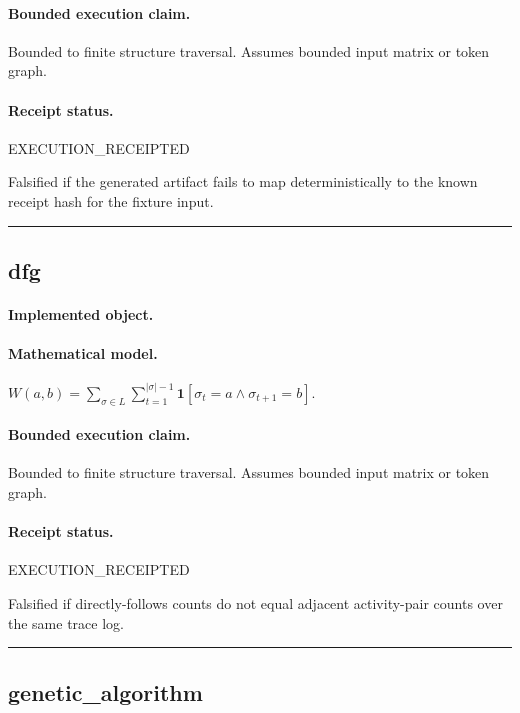 \paragraph{Bounded execution claim.} Bounded to finite structure traversal. Assumes bounded input matrix or token graph.
\paragraph{Receipt status.} EXECUTION\_RECEIPTED
\begin{falsifier}
Falsified if the generated artifact fails to map deterministically to the known receipt hash for the fixture input.
\end{falsifier}

\vspace{1em}\hrule\vspace{1em}
\subsection{dfg}
\paragraph{Implemented object.} 
\paragraph{Mathematical model.} $W(a,b)= \sum_{\sigma\in L} \sum_{t=1}^{|\sigma|-1} \mathbf{1}[\sigma_t=a\land\sigma_{t+1}=b].$
\paragraph{Bounded execution claim.} Bounded to finite structure traversal. Assumes bounded input matrix or token graph.
\paragraph{Receipt status.} EXECUTION\_RECEIPTED
\begin{falsifier}
Falsified if directly-follows counts do not equal adjacent activity-pair counts over the same trace log.
\end{falsifier}

\vspace{1em}\hrule\vspace{1em}
\subsection{genetic\_algorithm}
